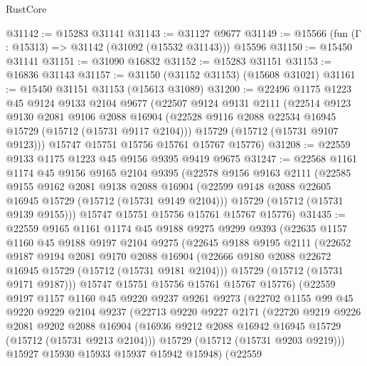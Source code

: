 \begin{lexlean}{RustCore}
\begin{coremodule}
@31142 := @15283 @31141
@31143 := @31127 @9677
@31149 := @15566 (fun (Γ : @15313) => @31142 (@31092 (@15532 @31143))) @15596
@31150 := @15450 @31141
@31151 := @31090 @16832
@31152 := @15283 @31151
@31153 := @16836 @31143
@31157 := @31150 (@31152 @31153) (@15608 @31021)
@31161 := @15450 @31151 @31153 (@15613 @31089)
@31200 := @22496
    @1175
    @1223
    @45
    @9124
    @9133
    @2104
    @9677
    (@22507
      @9124
      @9131
      @2111
      (@22514
        @9123
        @9130
        @2081
        @9106
        @2088
        @16904
        (@22528 @9116 @2088 @22534 @16945 @15729 (@15712 (@15731 @9117 @2104)))
        @15729
        (@15712 (@15731 @9107 @9123)))
      @15747
      @15751
      @15756
      @15761
      @15767
      @15776)
@31208 := @22559 @9133 @1175 @1223 @45 @9156 @9395 @9419 @9675
@31247 := @22568
    @1161
    @1174
    @45
    @9156
    @9165
    @2104
    @9395
    (@22578
      @9156
      @9163
      @2111
      (@22585
        @9155
        @9162
        @2081
        @9138
        @2088
        @16904
        (@22599 @9148 @2088 @22605 @16945 @15729 (@15712 (@15731 @9149 @2104)))
        @15729
        (@15712 (@15731 @9139 @9155)))
      @15747
      @15751
      @15756
      @15761
      @15767
      @15776)
@31435 := @22559
    @9165
    @1161
    @1174
    @45
    @9188
    @9275
    @9299
    @9393
    (@22635
      @1157
      @1160
      @45
      @9188
      @9197
      @2104
      @9275
      (@22645
        @9188
        @9195
        @2111
        (@22652
          @9187
          @9194
          @2081
          @9170
          @2088
          @16904
          (@22666 @9180 @2088 @22672 @16945 @15729 (@15712 (@15731 @9181 @2104)))
          @15729
          (@15712 (@15731 @9171 @9187)))
        @15747
        @15751
        @15756
        @15761
        @15767
        @15776)
      (@22559
        @9197
        @1157
        @1160
        @45
        @9220
        @9237
        @9261
        @9273
        (@22702
          @1155
          @99
          @45
          @9220
          @9229
          @2104
          @9237
          (@22713
            @9220
            @9227
            @2171
            (@22720
              @9219
              @9226
              @2081
              @9202
              @2088
              @16904
              (@16936 @9212 @2088 @16942 @16945 @15729 (@15712 (@15731 @9213 @2104)))
              @15729
              (@15712 (@15731 @9203 @9219)))
            @15927
            @15930
            @15933
            @15937
            @15942
            @15948)
          (@22559

\end{coremodule}
\end{lexlean}
